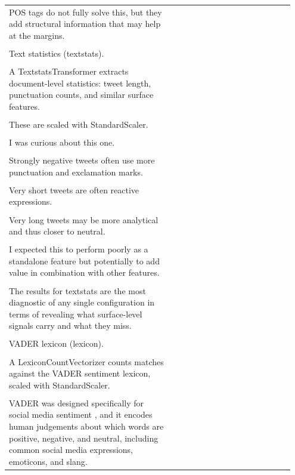 \documentclass[11pt]{article}
\begin{document}
\begin{longtable}{|p{0.55\linewidth}|p{0.40\linewidth}|}
\hline
\rule{0pt}{3.5cm} & \\
\hline
POS tags do not fully solve this, but they add structural information that may help at the margins. & \\[2pt]
\hline
\rule{0pt}{3.5cm} & \\
\hline
Text statistics (textstats). & \\[2pt]
\hline
\rule{0pt}{3.5cm} & \\
\hline
A TextstatsTransformer extracts document-level statistics: tweet length, punctuation counts, and similar surface features. & \\[2pt]
\hline
\rule{0pt}{3.5cm} & \\
\hline
These are scaled with StandardScaler. & \\[2pt]
\hline
\rule{0pt}{3.5cm} & \\
\hline
I was curious about this one. & \\[2pt]
\hline
\rule{0pt}{3.5cm} & \\
\hline
Strongly negative tweets often use more punctuation and exclamation marks. & \\[2pt]
\hline
\rule{0pt}{3.5cm} & \\
\hline
Very short tweets are often reactive expressions. & \\[2pt]
\hline
\rule{0pt}{3.5cm} & \\
\hline
Very long tweets may be more analytical and thus closer to neutral. & \\[2pt]
\hline
\rule{0pt}{3.5cm} & \\
\hline
I expected this to perform poorly as a standalone feature but potentially to add value in combination with other features. & \\[2pt]
\hline
\rule{0pt}{3.5cm} & \\
\hline
The results for textstats are the most diagnostic of any single configuration in terms of revealing what surface-level signals carry and what they miss. & \\[2pt]
\hline
\rule{0pt}{3.5cm} & \\
\hline
VADER lexicon (lexicon). & \\[2pt]
\hline
\rule{0pt}{3.5cm} & \\
\hline
A LexiconCountVectorizer counts matches against the VADER sentiment lexicon, scaled with StandardScaler. & \\[2pt]
\hline
\rule{0pt}{3.5cm} & \\
\hline
VADER was designed specifically for social media sentiment , and it encodes human judgements about which words are positive, negative, and neutral, including common social media expressions, emoticons, and slang. & \\[2pt]

\end{longtable}
\end{document}
